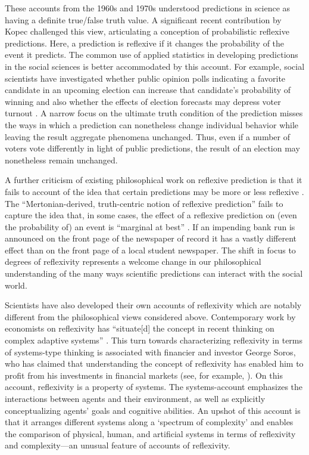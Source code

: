 These accounts from the 1960s and 1970s understood predictions in science as having a definite true/false truth value. A significant recent contribution by Kopec \autocite*{kopec2011} challenged this view, articulating a conception of probabilistic reflexive predictions. Here, a prediction is reflexive if it changes the probability of the event it predicts. The common use of applied statistics in developing predictions in the social sciences is better accommodated by this account. For example, social scientists have investigated whether public opinion polls indicating a favorite candidate in an upcoming election can increase that candidate's probability of winning \autocite{rothschild2014} and also whether the effects of election forecasts may depress voter turnout \autocite{westwood2020}. A narrow focus on the ultimate truth condition of the prediction misses the ways in which a prediction can nonetheless change individual behavior while leaving the result aggregate phenomena unchanged. Thus, even if a number of voters vote differently in light of public predictions, the result of an election may nonetheless remain unchanged.

A further criticism of existing philosophical work on reflexive prediction is that it fails to account of the idea that certain predictions may be more or less reflexive \autocite{lowe2018,cejka2022}. The ``Mertonian-derived, truth-centric notion of reflexive prediction'' \autocite[p10]{lowe2018} fails to capture the idea that, in some cases, the effect of a reflexive prediction on (even the probability of) an event is ``marginal at best'' \autocite[p8]{lowe2018}. If an impending bank run is announced on the front page of the newspaper of record it has a vastly different effect than on the front page of a local student newspaper. The shift in focus to degrees of reflexivity represents a welcome change in our philosophical understanding of the many ways scientific predictions can interact with the social world. 

Scientists have also developed their own accounts of reflexivity which are notably different from the philosophical views considered above. Contemporary work by economists on reflexivity has ``situate[d] the concept in recent thinking on complex adaptive systems'' \autocite[p331]{beinhocker2013}. This turn towards characterizing reflexivity in terms of systems-type thinking is associated with financier and investor George Soros, who has claimed that understanding the concept of reflexivity has enabled him to profit from his investments in financial markets (see, for example, \cite{soros2013}). On this account, reflexivity is a property of systems. The systems-account emphasizes the interactions between agents and their environment, as well as explicitly conceptualizing agents' goals and cognitive abilities. An upshot of this account is that it arranges different systems along a `spectrum of complexity' \autocite[p337]{beinhocker2013} and enables the comparison of physical, human, and artificial systems in terms of reflexivity and complexity---an unusual feature of accounts of reflexivity.


